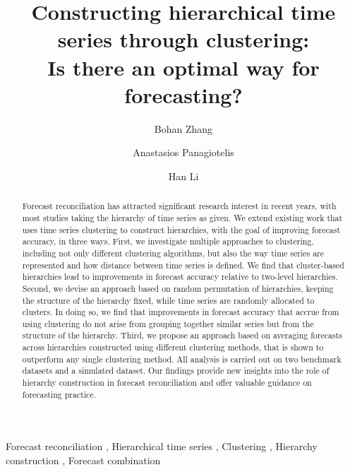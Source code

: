 \documentclass[a4paper,review,12pt,authoryear]{elsarticle}
\begin{document}
\begin{frontmatter}

\title{Constructing hierarchical time series through clustering: \\Is there an optimal way for forecasting?}



  \author[label1]{Bohan Zhang}
  \address[label1]{School of Economics and Management, Beihang University, Beijing, China}
  \author[label2]{Anastasios Panagiotelis}
  \address[label2]{The University of Sydney Business School, NSW 2006, Australia}
  \author[label3]{Han Li}
  \address[label3]{Department of Economics, The University of Melbourne, VIC 3010, Australia}

  \begin{abstract}

    Forecast reconciliation has attracted significant research interest in recent years, with most studies taking the hierarchy of time series as given. We extend existing work that uses time series clustering to construct hierarchies, with the goal of improving forecast accuracy, in three ways. First, we investigate multiple approaches to clustering, including not only different clustering algorithms, but also the way time series are represented and how distance between time series is defined. We find that cluster-based hierarchies lead to improvements in forecast accuracy relative to two-level hierarchies. Second, we devise an approach based on random permutation of hierarchies, keeping the structure of the hierarchy fixed, while time series are randomly allocated to clusters. In doing so, we find that improvements in forecast accuracy that accrue from using clustering do not arise from grouping together similar series but from the structure of the hierarchy. Third, we propose an approach based on averaging forecasts across hierarchies constructed using different clustering methods, that is shown to outperform any single clustering method. All analysis is carried out on two benchmark datasets and a simulated dataset. Our findings provide new insights into the role of hierarchy construction in forecast reconciliation and offer valuable guidance on forecasting practice. \\
    

  \end{abstract}

  \begin{keyword}
  Forecast reconciliation \sep
  Hierarchical time series \sep
  Clustering \sep
  Hierarchy construction \sep
  Forecast combination
  \end{keyword}

\end{frontmatter}
\end{document}
